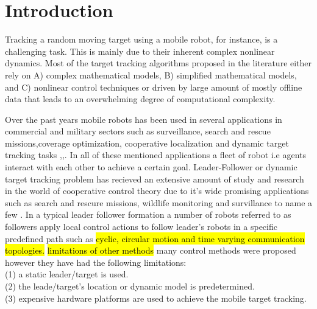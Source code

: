 \documentclass[conference]{IEEEtran}
\begin{document}

\section{Introduction}
\label{sec:introduction}

Tracking a random moving target using a mobile robot, for instance, is a challenging task. This is mainly due to their inherent complex nonlinear dynamics. Most of the target tracking algorithms proposed in the literature either rely on A) complex mathematical models, B) simplified mathematical models, and C) nonlinear control techniques or driven by large amount of mostly offline data that leads to an overwhelming degree of computational complexity.


Over the past years mobile robots has been used in several applications in commercial and military sectors such as surveillance, search and rescue missions,coverage optimization, cooperative localization and dynamic target tracking tasks \cite{kolling2006},\cite{Encarnacao2001},\cite{Ju2001}.  In all of these mentioned applications a fleet of robot i.e agents interact with each other to achieve a certain goal. Leader-Follower or dynamic target tracking problem has recieved an extensive amount of study and research in the world of cooperative control theory due to it's wide promising applications such as search and rescure missions, wildlife monitoring and survillance to name a few . In a typical leader follower formation a number of robots referred to as followers apply local control actions to follow leader's robots in a specific predefined path such as \hl {cyclic, circular motion and time varying communication topologies.} \hl {limitations of other methods} many control methods were proposed however they have had the following limitations:
\\(1) a static leader/target is used.
\\(2) the leade/target's location or dynamic model is predetermined.  
\\(3) expensive hardware platforms are used to achieve the mobile target tracking. 
\end{document}
